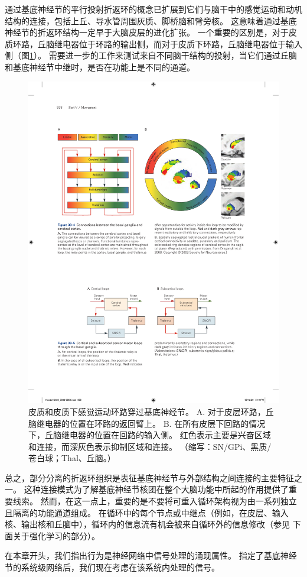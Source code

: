 通过基底神经节的平行投射折返环的概念已扩展到它们与脑干中的感觉运动和动机结构的连接，包括上丘、导水管周围灰质、脚桥脑和臂旁核。 这意味着通过基底神经节的折返环结构一定早于大脑皮层的进化扩张。 
一个重要的区别是，对于皮质环路，丘脑继电器位于环路的输出侧，而对于皮质下环路，丘脑继电器位于输入侧（图\ref{fig:38_5}）。
需要进一步的工作来测试来自不同脑干结构的投射，当它们通过丘脑和基底神经节中继时，是否在功能上是不同的通道。

\begin{figure}[htbp]
	\centering
	\includegraphics[width=0.7\linewidth]{chap38/fig_38_5}
	\caption{皮质和皮质下感觉运动环路穿过基底神经节。 A. 对于皮层环路，丘脑继电器的位置在环路的返回臂上。 B. 在所有皮层下回路的情况下，丘脑继电器的位置在回路的输入侧。 红色表示主要是兴奋区域和连接，而深灰色表示抑制区域和连接。 （缩写：SN/GPi、黑质/苍白球；Thal、丘脑。）}
	\label{fig:38_5}
\end{figure}

总之，部分分离的折返环组织是表征基底神经节与外部结构之间连接的主要特征之一。 这种连接模式为了解基底神经节核团在整个大脑功能中所起的作用提供了重要线索。 然而，在这一点上，重要的是不要将可重入循环架构视为由一系列独立且隔离的功能通道组成。 在循环中的每个节点或中继点（例如，在皮层、输入核、输出核和丘脑中），循环内的信息流有机会被来自循环外的信息修改（参见 下面关于强化学习的部分）。

在本章开头，我们指出行为是神经网络中信号处理的涌现属性。 指定了基底神经节的系统级网络后，我们现在考虑在该系统内处理的信号。


